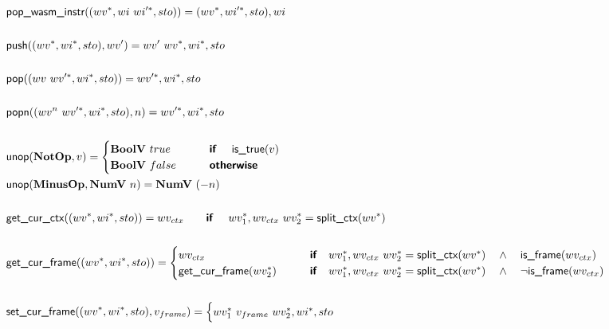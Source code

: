 \begin{align*}
  &\popwasminstr((\seq{wv}, wi ~ \seq{wi'}, sto)) = (\seq{wv}, \seq{wi'}, sto), wi \\
%
\newline \\
  &\push((\seq{wv}, \seq{wi}, sto), wv') = wv' ~ \seq{wv}, \seq{wi}, sto \\
%
\newline \\
  &\pop((wv ~ \seq{wv'}, \seq{wi}, sto)) = \seq{wv'}, \seq{wi}, sto \\
%
\newline \\
  &\popn((wv^n ~ \seq{wv'}, \seq{wi}, sto), n) = \seq{wv'}, \seq{wi}, sto \\
%
\newline \\
  &\unop(\notop, v) =
    \begin{cases}
      \boolv ~ true &\quad\quad\premise{if}\quad ~ \istrue(v) \\
      \boolv ~ false &\quad\quad\premise{otherwise} \\
    \end{cases}
  \\
  &\unop(\minusop, \numv ~ n) = \numv ~ (-n) \\
%
\newline \\
  &\getcurctx((\seq{wv}, \seq{wi}, sto)) =
  wv_{ctx} \quad\quad\premise{if}\quad ~ \seq{wv_1}, wv_{ctx} ~ \seq{wv_2} = \splitctx(\seq{wv}) \\
%
\newline \\
  &\getcurframe((\seq{wv}, \seq{wi}, sto)) =
    \begin{cases}
      wv_{ctx} &\quad\quad\premise{if}\quad
      \seq{wv_1}, wv_{ctx} ~ \seq{wv_2} = \splitctx(\seq{wv}) \quad\land\quad \isframe(wv_{ctx})\\
      \getcurframe(\seq{wv_2}) &\quad\quad\premise{if}\quad
      \seq{wv_1}, wv_{ctx} ~ \seq{wv_2} = \splitctx(\seq{wv}) \quad\land\quad \neg \isframe(wv_{ctx}) \\
    \end{cases}
  \\
%
\newline \\
  &\setcurframe((\seq{wv}, \seq{wi}, sto), v_{frame})
  =
  \begin{cases}
    \seq{wv_1} ~ v_{frame} ~ \seq{wv_2}, \seq{wi}, sto \\

\end{cases}
\end{align*}
